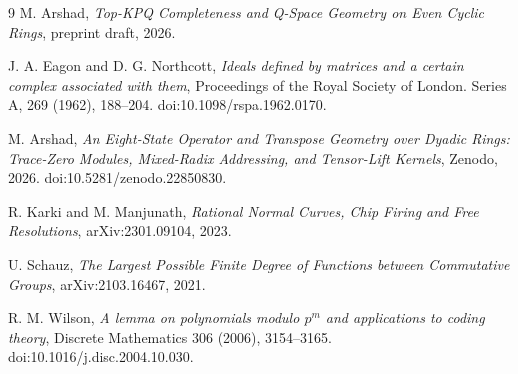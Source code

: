 \documentclass[11pt]{article}
\theoremstyle{definition}
\begin{document}
\begin{thebibliography}{9}
M. Arshad,
\emph{Top-KPQ Completeness and Q-Space Geometry on Even Cyclic Rings},
preprint draft, 2026.

J. A. Eagon and D. G. Northcott,
\emph{Ideals defined by matrices and a certain complex associated with them},
Proceedings of the Royal Society of London. Series A,
269 (1962), 188--204.
doi:10.1098/rspa.1962.0170.

M. Arshad,
\emph{An Eight-State Operator and Transpose Geometry over Dyadic Rings: Trace-Zero Modules, Mixed-Radix Addressing, and Tensor-Lift Kernels},
Zenodo, 2026.
doi:10.5281/zenodo.22850830.

R. Karki and M. Manjunath,
\emph{Rational Normal Curves, Chip Firing and Free Resolutions},
arXiv:2301.09104, 2023.

U. Schauz,
\emph{The Largest Possible Finite Degree of Functions between Commutative Groups},
arXiv:2103.16467, 2021.

R. M. Wilson,
\emph{A lemma on polynomials modulo $p^m$ and applications to coding theory},
Discrete Mathematics 306 (2006), 3154--3165.
doi:10.1016/j.disc.2004.10.030.
\end{thebibliography}
\end{document}
